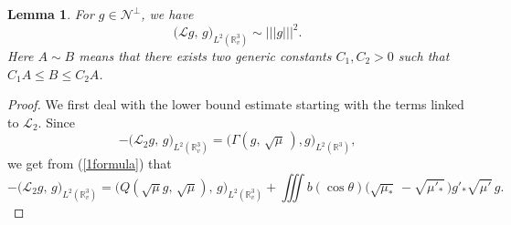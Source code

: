 \documentclass{amsart}[12pt, article]
\newtheorem{lemm}[theo]{Lemma}
\begin{document}
\begin{lemm}\label{lemm2.2.3}
For
$g\in \mathcal{N}^{\perp}$, we have
\begin{equation}\label{2.2.2+11}
 \Big({{\mathcal L}} g,\, g\Big)_{L^2({{{\mathbb R}}}^3_v)} \sim ||| g|||^2.
\end{equation}
Here $A\sim B$ means that there exists two generic constants
 $C_1, C_2>0$ such that $C_1A\le B\le C_2A$.
\end{lemm}

\begin{proof} We first deal with the lower bound estimate
starting with the terms linked to ${{\mathcal L}}_2$. Since
$$ -\Big({{\mathcal L}}_2 g,\, g\Big)_{L^2({{{\mathbb R}}}^3_v)} =\Big(\Gamma(g,\,
\sqrt\mu\,), g\Big)_{L^2({{{\mathbb R}}}^3)},$$
we get {}from (\ref{1formula}) that
\begin{equation}\label{radja-2}
-\Big({{\mathcal L}}_2 g,\, g\Big)_{L^2({{{\mathbb R}}}^3_v)} = \Big(Q (\sqrt{\mu} g,\, \sqrt{\mu} ),\, g\Big)_{L^2({{{\mathbb R}}}^3_v)} + \iiint
b(\cos\theta)\Big(\sqrt{\mu_\ast}\, - \sqrt{\mu'_\ast}\, \Big)
g'_\ast \sqrt{\mu'}\, g .
\end{equation}


\end{proof}
\end{document}
